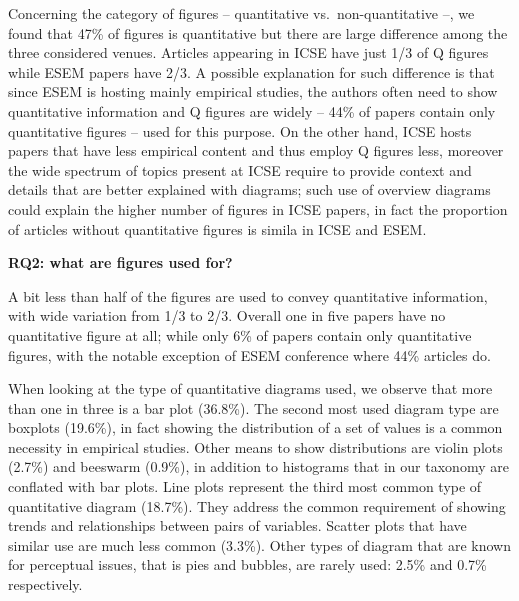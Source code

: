 \documentclass[
  10pt,
  conference,
]{IEEEtran}%
\begin{document}
Concerning the category of figures -- quantitative vs.~non-quantitative
--, we found that 47\% of figures is quantitative but there are large
difference among the three considered venues. Articles appearing in ICSE
have just 1/3 of Q figures while ESEM papers have 2/3. A possible
explanation for such difference is that since ESEM is hosting mainly
empirical studies, the authors often need to show quantitative
information and Q figures are widely -- 44\% of papers contain only
quantitative figures -- used for this purpose. On the other hand, ICSE
hosts papers that have less empirical content and thus employ Q figures
less, moreover the wide spectrum of topics present at ICSE require to
provide context and details that are better explained with diagrams;
such use of overview diagrams could explain the higher number of figures
in ICSE papers, in fact the proportion of articles without quantitative
figures is simila in ICSE and ESEM.

\begin{tcolorbox}[enhanced jigsaw, arc=.35mm, breakable, left=2mm, colback=white, colframe=quarto-callout-note-color-frame, rightrule=.15mm, toprule=.15mm, opacityback=0, bottomrule=.15mm, leftrule=.75mm]

\vspace{-3mm}\textbf{RQ2: what are figures used for?}\vspace{3mm}

A bit less than half of the figures are used to convey quantitative
information, with wide variation from 1/3 to 2/3. Overall one in five
papers have no quantitative figure at all; while only 6\% of papers
contain only quantitative figures, with the notable exception of ESEM
conference where 44\% articles do.

\end{tcolorbox}

When looking at the type of quantitative diagrams used, we observe that
more than one in three is a bar plot (36.8\%). The second most used
diagram type are boxplots (19.6\%), in fact showing the distribution of
a set of values is a common necessity in empirical studies. Other means
to show distributions are violin plots (2.7\%) and beeswarm (0.9\%), in
addition to histograms that in our taxonomy are conflated with bar
plots. Line plots represent the third most common type of quantitative
diagram (18.7\%). They address the common requirement of showing trends
and relationships between pairs of variables. Scatter plots that have
similar use are much less common (3.3\%). Other types of diagram that
are known for perceptual issues, that is pies and bubbles, are rarely
used: 2.5\% and 0.7\% respectively.
\end{document}
